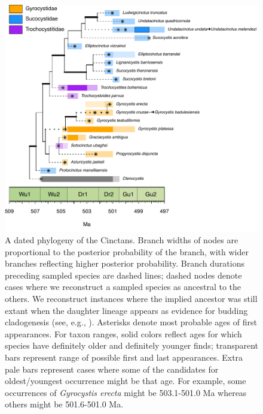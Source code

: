 \documentclass{article}
\begin{document}
\begin{figure}
  \includegraphics[width=\textwidth]{figures/Pretty Cinctans Families.pdf}

  \caption{A dated phylogeny of the Cinctans. Branch widths of nodes are proportional to the posterior probability of the branch, with wider branches reflecting higher posterior probability. Branch durations preceding sampled species are dashed lines; dashed nodes denote cases where we reconstruct a sampled species as ancestral to the others.  We reconstruct instances where the implied ancestor was still extant when the daughter lineage appears as evidence for budding cladogenesis (see, e.g., \citealp{Eldredge1971}). Asterisks denote most probable ages of first appearances.  For taxon ranges, solid colors reflect ages for which species have definitely older and definitely younger finds; transparent bars represent range of possible first and last appearances.  Extra pale bars represent cases where some of the candidates for oldest/youngest occurrence might be that age. For example,  some occurrences of \textit{Gyrocystis erecta} might be 503.1-501.0 Ma whereas others might be 501.6-501.0 Ma.  }
\end{figure}
\end{document}
